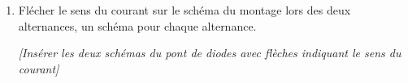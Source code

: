 \documentclass[11pt,a4paper]{article}
\begin{document}
\begin{enumerate}
\begin{enumerate}
\dotfill

\dotfill

\item Le voltmètre indique une tension $U_R = 13{,}5$ V lorsque la résistance est $R = 10\,\Omega$. \textbf{Calculer} l'intensité du courant traversant la résistance R.

\vspace{3cm}

\end{enumerate}

\item Flécher le sens du courant sur le schéma du montage lors des deux alternances, un schéma pour chaque alternance.

\vspace{0.5cm}

\begin{center}
\textit{[Insérer les deux schémas du pont de diodes avec flèches indiquant le sens du courant]}
\end{center}

\vspace{3cm}

\end{enumerate}
\end{document}
